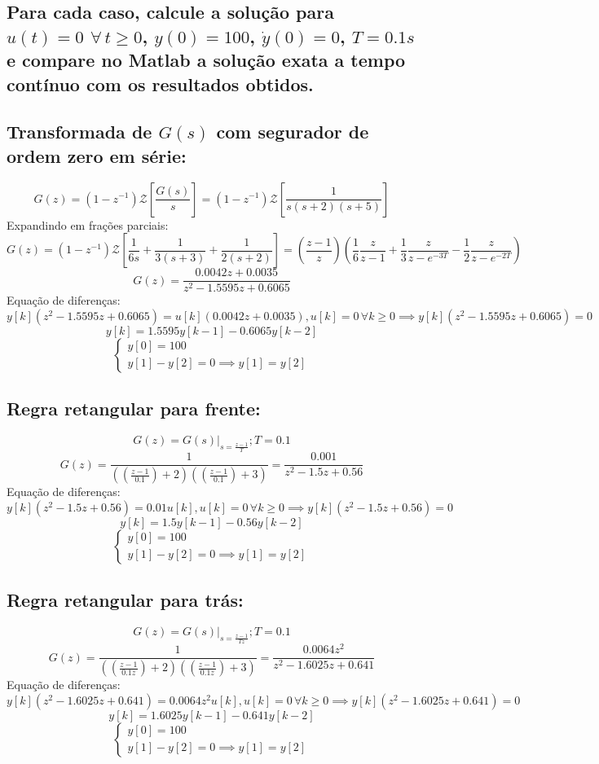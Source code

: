 \documentclass{article}
\begin{document}
\subsection*{Para cada caso, calcule a solução para $u(t) = 0$ $\forall\, t \geq 0$, $y(0) = 100$, $\dot{y}(0) = 0$, $T = 0.1s$ e compare no Matlab a solução exata a tempo contínuo com os resultados obtidos.}

\subsection{Transformada de $ G(s) $ com segurador de ordem zero em série:}
    \[ G(z) = (1-z^{-1}) \mathcal{Z}\left[ \frac{G(s)}{s} \right] = (1-z^{-1}) \mathcal{Z}\left[ \frac{1}{s(s+2)(s+5)} \right] \]
    {Expandindo em frações parciais:}
    \[ G(z) = (1-z^{-1}) \mathcal{Z}\left[ \frac{1}{6s} + \frac{1}{3(s+3)} + \frac{1}{2(s+2)} \right] = \left( \frac{z-1}{z} \right) \left( \frac 1 6 \frac{z}{z-1} + \frac 1 3 \frac{z}{z-e^{-3T}} - \frac 1 2 \frac{z}{z-e^{-2T}} \right) \]
    \[ G(z) = \frac{ 0.0042z + 0.0035 }{ z^2 - 1.5595z + 0.6065 } \]
    {Equação de diferenças:}
    \[ y[k](z^2 - 1.5595z + 0.6065) = u[k](0.0042z + 0.0035), u[k] = 0 \,\forall k \geq 0 \implies y[k](z^2 - 1.5595z + 0.6065) = 0 \]
    \[ y[k] = 1.5595 y[k-1] - 0.6065 y[k-2] \]
    \[ \begin{cases}
        y[0] = 100\\
        y[1] - y[2] = 0 \implies y[1] = y[2]
    \end{cases}\]


\subsection{Regra retangular para frente:}
    \[ G(z) = \left.G(s)\right|_{s=\frac{z-1}{T}}; T = 0.1 \]
    \[ G(z) = \frac{1}{\left( \left( \frac{z-1}{0.1}\right) +2 \right)\left( \left( \frac{z-1}{0.1}\right) +3 \right)} = \frac{0.001}{z^2 - 1.5z + 0.56} \]
    {Equação de diferenças:}
    \[ y[k](z^2 - 1.5z + 0.56) = 0.01 u[k], u[k] = 0 \,\forall k \geq 0 \implies y[k](z^2 - 1.5z + 0.56) = 0 \]
    \[ y[k] = 1.5 y[k-1] - 0.56 y[k-2] \]
    \[ \begin{cases}
        y[0] = 100\\
        y[1] - y[2] = 0 \implies y[1] = y[2]
    \end{cases}\]


\subsection{Regra retangular para trás:}
    \[ G(z) = \left.G(s)\right|_{s=\frac{z-1}{Tz}}; T = 0.1 \]
    \[ G(z) = \frac{1}{\left( \left( \frac{z-1}{0.1z} \right) +2 \right)\left( \left( \frac{z-1}{0.1z} \right) +3 \right)} = \frac{0.0064 z^2}{z^2 - 1.6025z + 0.641} \]
    {Equação de diferenças:}
    \[ y[k](z^2 - 1.6025z + 0.641) = 0.0064 z^2 u[k], u[k] = 0 \,\forall k \geq 0 \implies y[k](z^2 - 1.6025z + 0.641) = 0 \]
    \[ y[k] = 1.6025 y[k-1] - 0.641 y[k-2] \]
    \[ \begin{cases}
        y[0] = 100\\
        y[1] - y[2] = 0 \implies y[1] = y[2]
    \end{cases}\]
\end{document}

